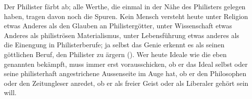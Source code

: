 Der Philister färbt ab; alle Werthe, die einmal in der Nähe des Philisters gelegen haben, tragen davon noch die Spuren. Kein Mensch versteht heute unter Religion etwas Anderes als den Glauben an Philistergötter, unter Wissenschaft etwas Anderes als philiströsen Materialismus, unter Lebensführung etwas anderes als die Einengung in Philisterberufe; ja selbst das Genie erkennt es als seinen göttlichen Beruf, den Philister zu ärgern (). Wer heute Ideale wie die eben genannten bekämpft, muss immer erst vorausschicken, ob er das Ideal selbst oder seine philisterhaft angestrichene Aussenseite im Auge hat, ob er den Philosophen oder den Zeitungleser anredet, ob er als freier Geist oder als Liberaler gehört sein will.
\par

